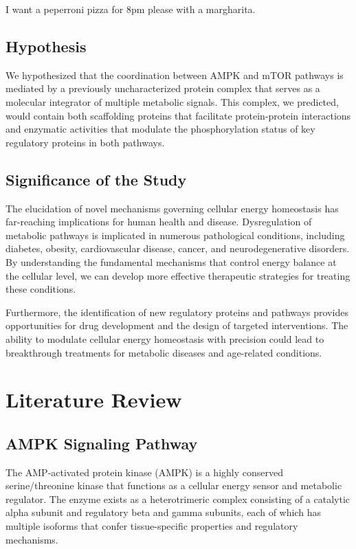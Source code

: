 \documentclass[11pt,a4paper]{article}
\begin{document}
I want a peperroni pizza for 8pm please with a margharita.

\subsection{Hypothesis}

We hypothesized that the coordination between AMPK and mTOR pathways is mediated by a previously uncharacterized protein complex that serves as a molecular integrator of multiple metabolic signals. This complex, we predicted, would contain both scaffolding proteins that facilitate protein-protein interactions and enzymatic activities that modulate the phosphorylation status of key regulatory proteins in both pathways.

\subsection{Significance of the Study}

The elucidation of novel mechanisms governing cellular energy homeostasis has far-reaching implications for human health and disease. Dysregulation of metabolic pathways is implicated in numerous pathological conditions, including diabetes, obesity, cardiovascular disease, cancer, and neurodegenerative disorders. By understanding the fundamental mechanisms that control energy balance at the cellular level, we can develop more effective therapeutic strategies for treating these conditions.

Furthermore, the identification of new regulatory proteins and pathways provides opportunities for drug development and the design of targeted interventions. The ability to modulate cellular energy homeostasis with precision could lead to breakthrough treatments for metabolic diseases and age-related conditions.

\section{Literature Review}

\subsection{AMPK Signaling Pathway}

The AMP-activated protein kinase (AMPK) is a highly conserved serine/threonine kinase that functions as a cellular energy sensor and metabolic regulator. The enzyme exists as a heterotrimeric complex consisting of a catalytic alpha subunit and regulatory beta and gamma subunits, each of which has multiple isoforms that confer tissue-specific properties and regulatory mechanisms.
\end{document}
